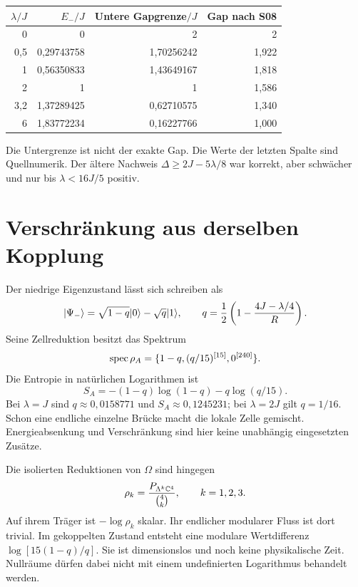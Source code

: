 \begin{center}
\begin{tabular}{rrrr}
\toprule $\lambda/J$&$E_-/J$&Untere Gapgrenze$/J$&Gap nach S08\\\midrule
0&0&2&2\\
0,5&0,29743758&1,70256242&1,922\\
1&0,56350833&1,43649167&1,818\\
2&1&1&1,586\\
3,2&1,37289425&0,62710575&1,340\\
6&1,83772234&0,16227766&1,000\\\bottomrule
\end{tabular}
\end{center}
Die Untergrenze ist nicht der exakte Gap. Die Werte der letzten Spalte sind Quellnumerik. Der ältere Nachweis $\Delta\ge2J-5\lambda/8$ war korrekt, aber schwächer und nur bis $\lambda<16J/5$ positiv.

\section{Verschränkung aus derselben Kopplung}
Der niedrige Eigenzustand lässt sich schreiben als
\begin{equation}
\lvert\Psi_-\rangle=\sqrt{1-q}\lvert0\rangle-\sqrt q\lvert1\rangle,
\qquad q=\frac12\left(1-\frac{4J-\lambda/4}{R}\right).
\end{equation}
Seine Zellreduktion besitzt das Spektrum
\begin{equation}
\operatorname{spec}\rho_A=\{1-q,(q/15)^{[15]},0^{[240]}\}.
\end{equation}
Die Entropie in natürlichen Logarithmen ist
\begin{equation}
S_A=-(1-q)\log(1-q)-q\log(q/15).
\end{equation}
Bei $\lambda=J$ sind $q\approx0{,}0158771$ und $S_A\approx0{,}1245231$; bei $\lambda=2J$ gilt $q=1/16$. Schon eine endliche einzelne Brücke macht die lokale Zelle gemischt. Energieabsenkung und Verschränkung sind hier keine unabhängig eingesetzten Zusätze.

Die isolierten Reduktionen von $\Omega$ sind hingegen
\begin{equation}
\rho_k=\frac{P_{\Lambda^k\mathbb C^4}}{\binom4k},\qquad k=1,2,3.
\end{equation}
Auf ihrem Träger ist $-\log\rho_k$ skalar. Ihr endlicher modularer Fluss ist dort trivial. Im gekoppelten Zustand entsteht eine modulare Wertdifferenz $\log[15(1-q)/q]$. Sie ist dimensionslos und noch keine physikalische Zeit. Nullräume dürfen dabei nicht mit einem undefinierten Logarithmus behandelt werden. 


